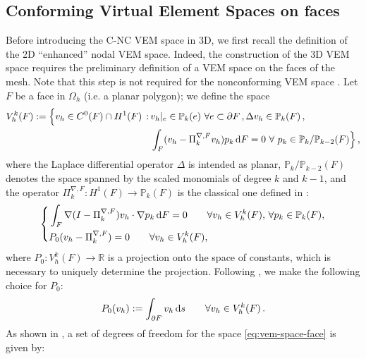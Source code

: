 \documentclass[a4paper,11pt]{article}
\theoremstyle{remark}
\theoremstyle{definition}
\newcommand{\Pol}{\mathbb{P}}
\newcommand{\PiNablaF}{\Pi^{\nabla,F}_k}
\begin{document}
\subsection{Conforming Virtual Element Spaces on faces}\label{sec:facevem}
Before introducing the C-NC VEM space in 3D, we first recall the definition of the 2D ``enhanced'' nodal VEM space. 
Indeed, the construction of the 3D VEM space \cite{Ahmad-Alsaedi-Brezzi-Marini-Russo:2013, BeiradaVeiga-Brezzi-Marini-Russo:2014} requires the preliminary definition of a VEM space on the faces of the mesh. 
Note that this step is not required for the nonconforming VEM space \cite{AyusodeDios-Lipnikov-Manzini:2016}. 
Let $F$ be a face in $\Omega_h$ (i.e. a planar polygon); we define the space
\begin{equation}\label{eq:vem-space-face}
    \begin{aligned}
    V_h^k(F) := \Big\{ v_h \in C^0(F) \cap H^1(F) \, : \, & v_h|_e \in \Pol_k(e) \ \forall e \subset \partial F 
    \, , \Delta v_h \in \Pol_{k}(F) \, , \\
    & \int_F (v_h-\PiNablaF v_h) p_k\,{\rm d}F = 0 \ \forall \ p_k \in \Pol_k/\Pol_{k-2}(F) \Big\} \, ,
\end{aligned}
\end{equation}
where the Laplace differential operator $\Delta$ is intended as planar, 
$\Pol_k/\Pol_{k-2}(F)$ denotes the space spanned by the scaled monomials of degree $k$ and $k-1$, and
the operator $\PiNablaF : H^1(F) \rightarrow \Pol_k(F)$ is the classical one defined in \cite{BeiradaVeiga-Brezzi-Cangiani-Manzini-Marini-Russo:2013}:
$$
\left\{
\begin{aligned}
&\int_F \nabla (I - \PiNablaF) v_h \cdot \nabla p_k \,{\rm d}F = 0 \qquad \forall v_h \in V_h^k(F), \, \forall p_k\in\Pol_k(F), \\
&P_0(v_h - \PiNablaF) = 0 \qquad \forall v_h \in V^k_h(F),
\end{aligned}
\right .
$$
where $P_0: V^k_h(F) \rightarrow \mathbb{R}$ is a projection onto the space of constants, which is necessary to uniquely determine the projection.
Following \cite{BeiradaVeiga-Brezzi-Marini-Russo:2014}, we make the following choice for $P_0$:
\begin{equation} \label{eq:P0}
P_0(v_h) :=
\int_{\partial F} v_h \,{\rm d}s \qquad \forall v_h \in V_h^k(F) \, .
\end{equation}
As shown in \cite{Ahmad-Alsaedi-Brezzi-Marini-Russo:2013}, a set of degrees of freedom for the space \eqref{eq:vem-space-face} is given by:
\end{document}
